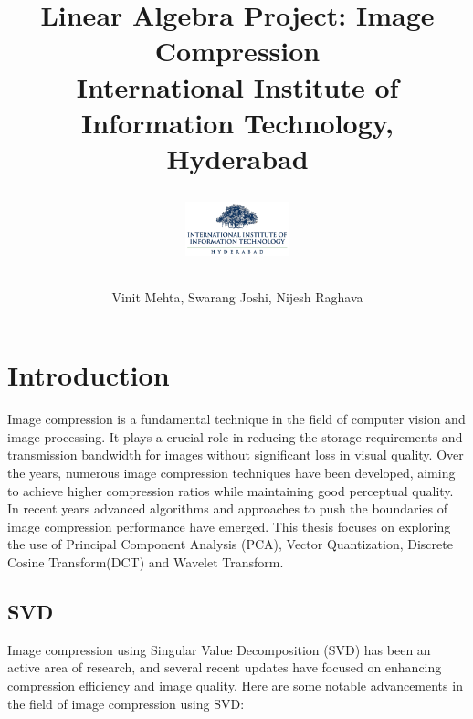 \documentclass{article}
\begin{document}
\title{
    {Linear Algebra Project: Image Compression}\\
    {\large International Institute of Information Technology, Hyderabad}\\
    \author{Vinit Mehta, Swarang Joshi, Nijesh Raghava}
    \vspace{1cm}
    \includegraphics[width=3cm]{IIITH.png}
}
\date{}

\maketitle

\section{Introduction}
Image compression is a fundamental technique in the field of computer vision and image processing. It plays a crucial role in reducing the storage requirements and transmission bandwidth for images without significant loss in visual quality. Over the years, numerous image compression techniques have been developed, aiming to achieve higher compression ratios while maintaining good perceptual quality. In recent years advanced algorithms and approaches to push the boundaries of image compression performance have emerged. This thesis focuses on exploring the use of Principal Component Analysis (PCA), Vector Quantization, Discrete Cosine Transform(DCT) and Wavelet Transform.

\subsection{SVD}
Image compression using Singular Value Decomposition (SVD) has been an active area of research, and several recent updates have focused on enhancing compression efficiency and image quality. Here are some notable advancements in the field of image compression using SVD:
\end{document}
